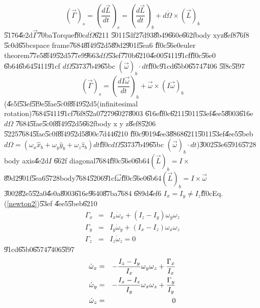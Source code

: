 \documentclass[12pt]{article}
\begin{document}
\begin{equation}
\left( \vec{\Gamma}\right) _{s}=\left( \frac{d\vec{L}}{dt}\right)
_{s}=\left( \frac{d\vec{L}}{dt}\right) _{b}+d\dot{\Omega}\times \left( \vec{L%
}\right) _{b}  \label{newton1}
\end{equation}%
\U{5176}\U{4e2d}$\vec{\Gamma}$\U{70ba}Torque\U{ff0c}$d\dot{\Omega}$\U{6211}%
\U{5011}\U{5df2}\U{7d93}\U{8b49}\U{660e}\U{662f}body xyz\U{8ef8}\U{76f8}%
\U{5c0d}\U{65bc}space frame\U{7684}\U{8f49}\U{52d5}\U{89d2}\U{901f}\U{5ea6}%
\U{ff0c}\U{56e0}euler theorem\U{77e5}\U{8f49}\U{52d5}\U{77e9}\U{9663}$%
d\Omega $\U{53ef}\U{770b}\U{6210}\U{4e00}\U{5411}\U{91cf}\U{ff0c}\U{56e0}%
\U{6b64}\U{6b64}\U{5411}\U{91cf} $d\Omega $\U{5373}\U{7b49}\U{65bc} $\left( 
\vec{\omega}\right) _{b}\cdot dt$\U{ff0c}\U{91cd}\U{65b0}\U{6574}\U{7406}%
\U{5f8c}\U{5f97}%
\begin{equation}
\left( \vec{\Gamma}\right) _{s}=\left( \frac{dI\vec{\omega}}{dt}\right) _{b}+%
\vec{\omega}\times \left( I\vec{\omega}\right) _{b}  \label{newton2}
\end{equation}%
(\U{4e5f}\U{53ef}\U{5f9e}\U{5fae}\U{5c0f}\U{8f49}\U{52d5}(infinitesimal
rotation)\U{7684}\U{5411}\U{91cf}\U{76f8}\U{52a0}\U{7279}\U{6027}\U{8003}%
\U{616e}\U{ff0c}\U{6211}\U{5011}\U{53ef}\U{4ee5}\U{8003}\U{616e}$d\Omega $%
\U{7684}\U{5fae}\U{5c0f}\U{8f49}\U{52d5}\U{662f}body x y z\U{8ef8}\U{5206}%
\U{5225}\U{7684}\U{5fae}\U{5c0f}\U{8f49}\U{52d5}\U{800c}\U{7d44}\U{6210}%
\U{ff0c}\U{9019}\U{4ee3}\U{8868}\U{6211}\U{5011}\U{53ef}\U{4ee5}\U{5beb}$%
d\Omega =(\omega _{x}\hat{x}_{b}+\omega _{y}\hat{y}_{b}+\omega _{z}\hat{z}%
_{b})dt$\U{ff0c}$d\Omega $\U{5373}\U{7b49}\U{65bc} $\left( \vec{\omega}%
\right) _{b}\cdot dt$)\U{3002}\U{53e6}\U{5916}\U{5728} body axis\U{4e2d}$I$%
\U{662f} diagonal\U{7684}\U{ff0c}\U{56e0}\U{6b64}$\left( \vec{L}\right)
_{b}=I\times $ \U{89d2}\U{901f}\U{5ea6}\U{5728}body\U{7684}\U{5206}\U{91cf}$%
\vec{\omega}$\U{ff0c}\U{56e0}\U{6b64}$(\vec{L})_{b}=I\times \vec{\omega}$%
\U{3002}\U{82e5}\U{52a0}\U{4e0a}\U{8003}\U{616e}\U{9640}\U{87ba}\U{7684}%
\U{689d}\U{4ef6} $I_{x}=I_{y}\neq I_{z}$\U{ff0c}Eq.(\ref{newton2})\U{53ef}%
\U{4ee5}\U{5beb}\U{6210}%
\begin{eqnarray}
\Gamma _{x} &=&I_{x}\dot{\omega}_{x}+(I_{z}-I_{y})\omega _{y}\omega _{z} \\
\Gamma _{y} &=&I_{y}\dot{\omega}_{y}+(I_{x}-I_{z})\omega _{x}\omega _{z} \\
\Gamma _{z} &=&I_{z}\dot{\omega}_{z}=0
\end{eqnarray}%
\U{91cd}\U{65b0}\U{6574}\U{7406}\U{5f97}%
\begin{eqnarray}
\dot{\omega}_{x} &=&-\frac{I_{z}-I_{y}}{I_{x}}\omega _{y}\omega _{z}+\frac{%
\Gamma _{x}}{I_{x}} \\
\dot{\omega}_{y} &=&-\frac{I_{x}-I_{z}}{I_{y}}\omega _{x}\omega _{z}+\frac{%
\Gamma _{y}}{I_{y}} \\
\dot{\omega}_{z} &=&0
\end{eqnarray}%
\end{document}
